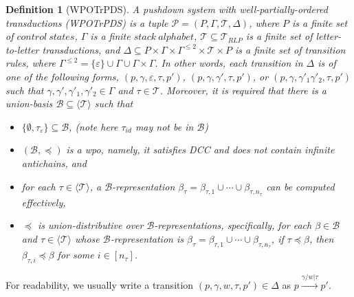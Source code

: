 \documentclass[preprint,12pt]{elsarticle}
\newtheorem{definition}{Definition}
\newcommand\Pp{{\mathcal{P} }}
\newcommand\TranSet{{\mathscr{T} }}
\newcommand\UTrans{{\mathscr{T}_{RLP} }}
\newcommand\Tranbasis{{\mathscr{B} }}
\newcommand{\WOTrPDS}{\textsf{WPOTrPDS}}
\begin{document}
\begin{definition}[\WOTrPDS] \label{def:defatpds}
    A \emph{pushdown system with well-partially-ordered transductions} (\WOTrPDS) is a tuple $\Pp = (P, \Gamma, \TranSet, \Delta)$, 
    where $P$ is a finite set of $control\ states$, $\Gamma$ is a finite $stack\ alphabet$, $\TranSet \subseteq \UTrans$ is a finite set of letter-to-letter transductions, and $\Delta \subseteq P \times \Gamma \times \Gamma^{\le 2} \times \TranSet \times P$ is a finite set of transition rules, where $\Gamma^{\le 2} = \{\varepsilon\} \cup \Gamma \cup \Gamma \times \Gamma$. In other words, each transition in $\Delta$ is of one of the following forms, $(p, \gamma, \varepsilon, \tau, p')$, $(p, \gamma, \gamma',\tau, p')$, or $(p, \gamma, \gamma'_1 \gamma'_2, \tau, p')$ such that $\gamma, \gamma', \gamma'_1, \gamma'_2 \in \Gamma$ and $\tau \in \TranSet$. 
   Moreover, it is required that there is a union-basis $\Tranbasis \subseteq \langle \TranSet \rangle$ such that 
   \begin{itemize}
   \item $\{\emptyset, \tau_{\varepsilon}\} \subseteq \Tranbasis$,  (note here $\tau_{id}$ may not be in $\Tranbasis$)
   \item  $(\Tranbasis, \preceq)$ is a wpo, namely, it satisfies DCC and does not contain infinite antichains, and
%
   \item for each $\tau \in \langle \TranSet \rangle$, a $\Tranbasis$-representation $\beta_\tau = \beta_{\tau, 1} \cup \cdots \cup \beta_{\tau, n_\tau}$ can be computed effectively, 
%
   \item $\preceq$ is union-distributive over $\Tranbasis$-representations, specifically, for each $\beta \in \Tranbasis$ and $\tau \in \langle \TranSet \rangle$ whose $\Tranbasis$-representation is $\beta_\tau=\beta_{\tau, 1} \cup \cdots \cup \beta_{\tau, n_\tau}$, if $\tau \preceq \beta$, then $ \beta_{\tau, i} \preceq \beta$ for some $i \in [n_\tau]$.
\end{itemize}
\end{definition}
For readability, we usually write a transition $(p, \gamma, w, \tau, p') \in \Delta$ as $p \xrightarrow{\gamma/w | \tau} p'$.
\end{document}
